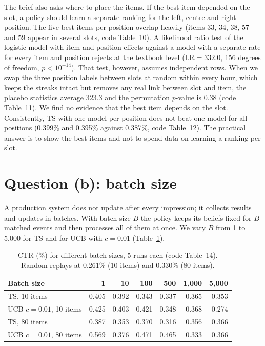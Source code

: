 \documentclass[11pt]{article}
\begin{document}
The brief also asks where to place the items. If the best item depended on
the slot, a policy should learn a separate ranking for the left, centre and
right position. The five best items per position overlap heavily (items 33,
34, 38, 57 and 59 appear in several slots, code Table~10). A likelihood ratio
test of the logistic model with item and position effects against a model
with a separate rate for every item and position rejects at the textbook
level ($\text{LR}=332.0$, 156 degrees of freedom, $p<10^{-14}$). That test,
however, assumes independent rows. When we swap the three position labels
between slots at random within every hour, which keeps the streaks intact but
removes any real link between slot and item, the placebo statistics average
323.3 and the permutation $p$-value is 0.38 (code Table~11). We find no
evidence that the best item depends on the slot. Consistently, TS with one
model per position does not beat one model for all positions (0.399\% and
0.395\% against 0.387\%, code Table~12). The practical answer is to show the
best items and not to spend data on learning a ranking per slot.

\section{Question (b): batch size}
\label{sec:b}

A production system does not update after every impression; it collects
results and updates in batches. With batch size $B$ the policy keeps its
beliefs fixed for $B$ matched events and then processes all of them at once.
We vary $B$ from 1 to 5{,}000 for TS and for UCB with $c=0.01$
(Table~\ref{tab:b}).

\begin{table}[H]
  \centering
  \caption{CTR (\%) for different batch sizes, 5 runs each (code Table~14).
    Random replays at 0.261\% (10 items) and 0.330\% (80 items).}
  \label{tab:b}
  \small
  \begin{tabular}{lrrrrrr}
    \toprule
    Batch size & 1 & 10 & 100 & 500 & 1{,}000 & 5{,}000 \\
    \midrule
    TS, 10 items            & 0.405 & 0.392 & 0.343 & 0.337 & 0.365 & 0.353 \\
    UCB $c=0.01$, 10 items  & 0.425 & 0.403 & 0.421 & 0.348 & 0.368 & 0.274 \\
    TS, 80 items            & 0.387 & 0.353 & 0.370 & 0.316 & 0.356 & 0.366 \\
    UCB $c=0.01$, 80 items  & 0.569 & 0.376 & 0.471 & 0.465 & 0.333 & 0.366 \\
    \bottomrule
  \end{tabular}
\end{table}
\end{document}
